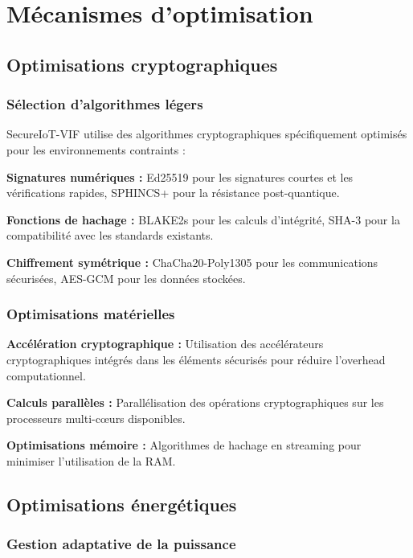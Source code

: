 \section{Mécanismes d'optimisation}

\subsection{Optimisations cryptographiques}

\subsubsection{Sélection d'algorithmes légers}

SecureIoT-VIF utilise des algorithmes cryptographiques spécifiquement optimisés pour les environnements contraints :

\textbf{Signatures numériques :} Ed25519 pour les signatures courtes et les vérifications rapides, SPHINCS+ pour la résistance post-quantique.

\textbf{Fonctions de hachage :} BLAKE2s pour les calculs d'intégrité, SHA-3 pour la compatibilité avec les standards existants.

\textbf{Chiffrement symétrique :} ChaCha20-Poly1305 pour les communications sécurisées, AES-GCM pour les données stockées.

\subsubsection{Optimisations matérielles}

\textbf{Accélération cryptographique :} Utilisation des accélérateurs cryptographiques intégrés dans les éléments sécurisés pour réduire l'overhead computationnel.

\textbf{Calculs parallèles :} Parallélisation des opérations cryptographiques sur les processeurs multi-cœurs disponibles.

\textbf{Optimisations mémoire :} Algorithmes de hachage en streaming pour minimiser l'utilisation de la RAM.

\subsection{Optimisations énergétiques}

\subsubsection{Gestion adaptative de la puissance}

